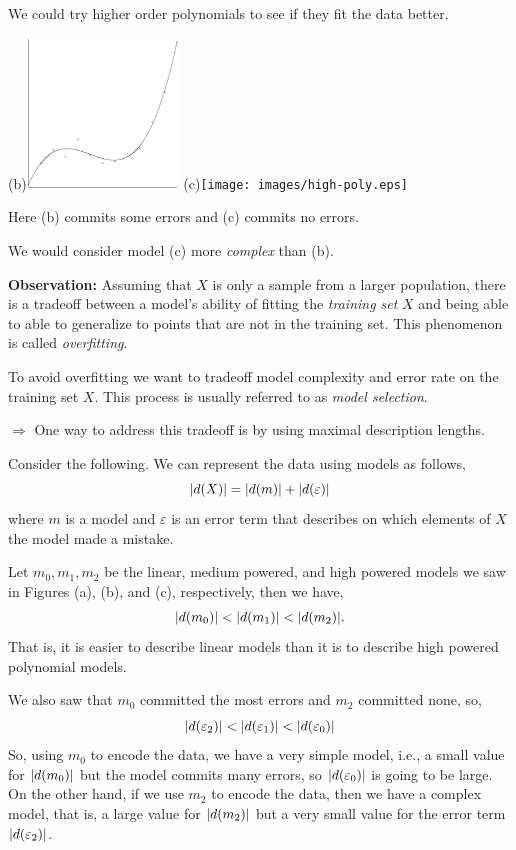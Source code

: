 \documentclass[a4paper,blends,pdf,colorBG,slideColor]{prosper}
\begin{document}
\es

We could try higher order polynomials to see if they fit the data better.

\begin{center}
(b)\includegraphics[height=40mm]{images/low-poly.eps}
\hspace{.2in}
(c)\texttt{[image: images/high-poly.eps]}
\end{center}

Here (b) commits some errors and (c) commits no errors.

We would consider model (c) more {\em complex} than (b).
\es

\vspace{.2in}
{\bf Observation:} Assuming that $X$ is only a sample from a larger population, there is a tradeoff between 
a model's ability of fitting the {\em training set} $X$ and being able to able to generalize to points
that are not in the training set.  This phenomenon is called {\em overfitting}.  

To avoid overfitting we want to tradeoff model complexity and error rate on the training set $X$.
This process is usually referred to as {\em model selection}.

$\Rightarrow$ One way to address this tradeoff is by using maximal description lengths.
\es


\small
Consider the following.  We can represent the data using models as follows,
\[
{|{d(X)}|} = {|{d(m)}|} + {|{d(\varepsilon)}|}
\]
where $m$ is a model and $\varepsilon$ is an error term that describes on which elements of $X$
the model made a mistake.  

Let $m_0, m_1, m_2$ be the linear, medium powered, and high powered models we saw in 
Figures (a), (b), and (c), respectively, then
we have,
\[
{|{d(m_0)}|} < {|{d(m_1)}|} < {|{d(m_2)}|}.
\]
That is, it is easier to describe linear models than it is to describe high powered polynomial
models.

We also saw that $m_0$ committed the most errors and $m_2$ committed none, so,
\[
{|{d(\varepsilon_2)}|} < {|{d(\varepsilon_1)}|} < {|{d(\varepsilon_0)}|}
\]
So, using $m_0$ to encode the data, we have a very simple model, i.e., a small value for ${|{d(m_0)}|}$
but the model commits many errors, so ${|{d(\varepsilon_0)}|}$ is going to be large.
On the other hand, if we use $m_2$ to encode the data, then we have a complex model, that is, a
large value for ${|{d(m_2)}|}$ but a very small value for the error term ${|{d(\varepsilon_2)}|}$.
\es
\end{document}

